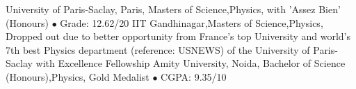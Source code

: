 %
%
%


\begin{scholarship}
					{University of Paris-Saclay, Paris, Masters of Science,Physics, with 'Assez Bien' (Honours) $\bullet$ Grade: 12.62/20}
					{}{}
					{IIT Gandhinagar,Masters of Science,Physics, Dropped out due to better opportunity from France's top University and world's 7th best Physics department (reference: USNEWS) of the University of Paris-Saclay with Excellence Fellowship}
					{Amity University, Noida, Bachelor of Science (Honours),Physics, Gold Medalist $\bullet$ CGPA: 9.35/10}
\end{scholarship}
